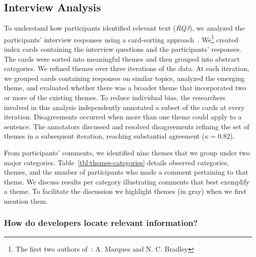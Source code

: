 
\subsection{Interview Analysis}

To understand how participants identified relevant text (\textit{RQ3}), we analyzed the participants'
interview responses using a card-sorting approach~\cite{spencer2009sorting}.
We\footnote{The first two authors of~\cite{marques2020}: A. Marques and N. C. Bradley} created index cards containing the interview questions and the participants' responses.
The cards were sorted into meaningful themes and then grouped into abstract categories.
We refined themes over three iterations of the data.
At each  iteration, we grouped cards containing responses on similar topics, analyzed the emerging theme, and evaluated
whether there was a broader theme that incorporated two or more of the existing themes.
To reduce individual bias, the researchers involved in this analysis independently annotated a subset of the cards at every iteration.
Disagreements occurred when more than one theme could apply to a sentence.
The annotators discussed and resolved disagreements refining the set of themes in a subsequent iteration, reaching substantial agreement ($\kappa=0.82$).





From participants' comments, we identified nine themes that we group under two major categories.
Table~\ref{tbl:themes-categories} details observed categories, themes, and the number of participants who made a comment pertaining to that theme.
We discuss results per category illustrating comments that best exemplify a theme. To facilitate the discussion we highlight themes (in gray)
when we first mention them.





\afterpage{

}



\subsubsection{How do developers locate relevant information?}
\label{cp3:search-strategies}

